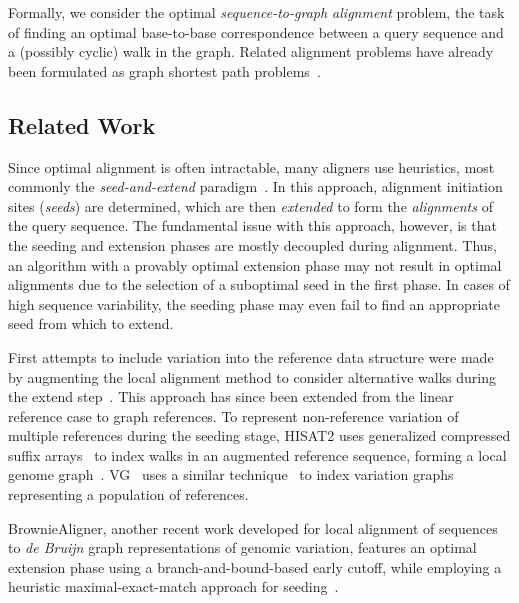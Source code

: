 Formally, we consider the optimal \textit{sequence-to-graph alignment} problem, the task of finding an optimal base-to-base correspondence between a query sequence and a (possibly cyclic) walk in the graph.
Related alignment problems have already been formulated as graph shortest path
problems~\cite{antipov_hybridspades_2016,jain_complexity_2019}.


\subsection{Related Work}
Since optimal alignment is often intractable, many aligners use heuristics, most
commonly the \emph{seed-and-extend}
paradigm~\cite{altschul_basic_1990,langmead_fast_2012,li_fast_2009}. In this
approach, alignment initiation sites (\emph{seeds}) are determined, which are
then \emph{extended} to form the \emph{alignments} of the query sequence. The
fundamental issue with this approach, however, is that the seeding and extension
phases are mostly decoupled during alignment. Thus, an algorithm with a provably
optimal extension phase may not result in optimal alignments due to the
selection of a suboptimal seed in the first phase. In cases of high sequence
variability, the seeding phase may even fail to find an appropriate seed from
which to extend.


First attempts to include variation into the reference data structure were made
by augmenting the local alignment method to consider alternative walks during the
extend step~\cite{schneeberger_simultaneous_2009,palmapper}. This approach has
since been extended from the linear reference case to graph references. To
represent non-reference variation of multiple references during the seeding
stage, HISAT2 uses generalized compressed suffix
arrays~\cite{siren_indexing_2014} to index walks in an augmented reference
sequence, forming a local genome graph~\cite{kim_graphbased_2019}.
VG~\cite{garrison_variation_2018} uses a similar
technique~\cite{siren_indexing_2017} to index variation graphs representing a
population of references.

BrownieAligner, another recent work developed for local alignment of sequences
to {\it de Bruijn} graph representations of genomic variation, features an
optimal extension phase using a branch-and-bound-based early cutoff, while
employing a heuristic maximal-exact-match approach for
seeding~\cite{heydari_browniealigner_2018}.

